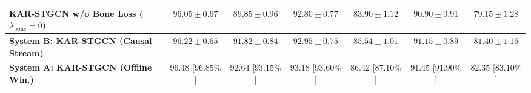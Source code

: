 \documentclass[10pt,twocolumn]{article}
\begin{document}
\begin{table}[!t]
{\begin{tabular}{lcccccc}
KAR-STGCN w/o Bone Loss ($\lambda_{\text{bone}}=0$) & $96.05 \pm 0.67$ & $89.85 \pm 0.96$ & $92.80 \pm 0.77$ & $83.90 \pm 1.12$ & $90.90 \pm 0.91$ & $79.15 \pm 1.28$ \\
\midrule
\textbf{System B: KAR-STGCN (Causal Stream)} & $96.22 \pm 0.65$ & $91.82 \pm 0.84$ & $92.95 \pm 0.75$ & $85.54 \pm 1.01$ & $91.15 \pm 0.89$ & $81.40 \pm 1.16$ \\
\textbf{System A: KAR-STGCN (Offline Win.)} & $\mathbf{96.48}$ [$96.85\%$] & $\mathbf{92.64}$ [$93.15\%$] & $\mathbf{93.18}$ [$93.60\%$] & $\mathbf{86.42}$ [$87.10\%$] & $\mathbf{91.45}$ [$91.90\%$] & $\mathbf{82.35}$ [$83.10\%$] \\
\bottomrule
\end{tabular}
}
\end{table}

\begin{table}[!t]
\centering
\caption{Cross-dataset transfer onto real first-generation Leap Motion streams from LMDHG \cite{boulahia2017dynamic} ($N=21$ subjects, $608$ gesture instances, 13 classes). Held-out restoration metrics ($\text{MPJPE}_{\text{miss}}$, BLCE) are evaluated on contiguous masked segments of verified tracking frames, whereas Macro-F1 is evaluated on natural unmasked sensor streams.}
\label{tab:sim_to_real_lmdhg}
\end{table}
\end{document}
